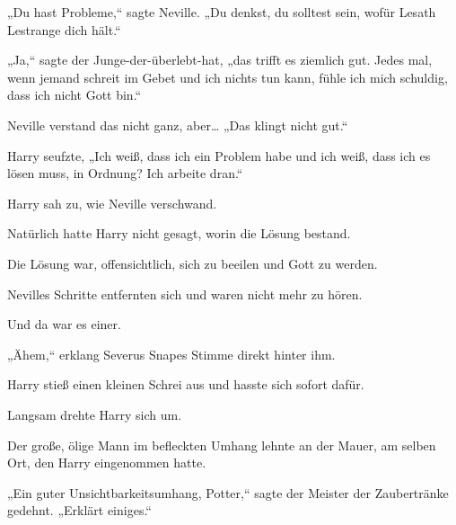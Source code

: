 „Du hast Probleme,“ sagte Neville. „Du denkst, du solltest sein, wofür Lesath Lestrange dich hält.“

„Ja,“ sagte der Junge-der-überlebt-hat, „das trifft es ziemlich gut. Jedes mal, wenn jemand schreit im Gebet und ich nichts tun kann, fühle ich mich schuldig, dass ich nicht Gott bin.“

Neville verstand das nicht ganz, aber… „Das klingt nicht gut.“

Harry seufzte, „Ich weiß, dass ich ein Problem habe und ich weiß, dass ich es lösen muss, in Ordnung? Ich arbeite dran.“

\later

Harry sah zu, wie Neville verschwand.

Natürlich hatte Harry nicht gesagt, worin die Lösung bestand.

Die Lösung war, offensichtlich, sich zu beeilen und Gott zu werden.

Nevilles Schritte entfernten sich und waren nicht mehr zu hören.

Und da war es einer.

„Ähem,“ erklang Severus Snapes Stimme direkt hinter ihm.

Harry stieß einen kleinen Schrei aus und hasste sich sofort dafür.

Langsam drehte Harry sich um.

Der große, ölige Mann im befleckten Umhang lehnte an der Mauer, am selben Ort, den Harry eingenommen hatte.

„Ein guter Unsichtbarkeitsumhang, Potter,“ sagte der Meister der Zaubertränke gedehnt. „Erklärt einiges.“

